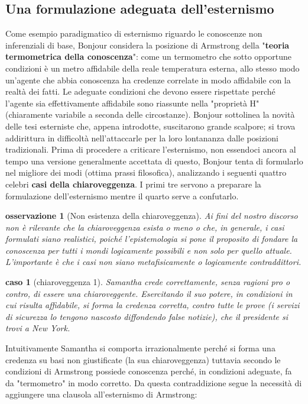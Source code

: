 \documentclass[10pt,a4paper]{article}
\newtheorem{caso}{caso}
\newtheorem{osservazione}{osservazione}
\begin{document}
\subsection{Una formulazione adeguata dell'esternismo}
Come esempio paradigmatico di esternismo riguardo le conoscenze non inferenziali di base, Bonjour considera la posizione di Armstrong della "\textbf{teoria termometrica della conoscenza}": come un termometro che sotto opportune condizioni è un metro affidabile della reale temperatura esterna, allo stesso modo un'agente che abbia conoscenza ha credenze correlate in modo affidabile con la realtà dei fatti. Le adeguate condizioni che devono essere rispettate perché l'agente sia effettivamente affidabile sono riassunte nella "proprietà H" (chiaramente variabile a seconda delle circostanze). Bonjour sottolinea la novità delle tesi esterniste che, appena introdotte, suscitarono grande scalpore; si trova addirittura in difficoltà nell'attaccarle per la loro lontananza dalle posizioni tradizionali. Prima di procedere a criticare l'esternismo, non essendoci ancora al tempo una versione generalmente accettata di questo, Bonjour tenta di formularlo nel migliore dei modi (ottima prassi filosofica), analizzando i seguenti quattro celebri \textbf{casi della chiaroveggenza}. I primi tre servono a preparare la formulazione dell'esternismo mentre il quarto serve a confutarlo. 
\begin{osservazione}[Non esistenza della chiaroveggenza]
Ai fini del nostro discorso non è rilevante che la chiaroveggenza esista o meno o che, in generale, i casi formulati siano realistici, poiché l'epistemologia si pone il proposito di fondare la conoscenza per tutti i mondi logicamente possibili e non solo per quello attuale. L'importante è che i casi non siano metafisicamente o logicamente contraddittori.
\end{osservazione}
\begin{caso}[chiaroveggenza 1]
	Samantha crede correttamente, senza ragioni pro o contro, di essere una chiaroveggente. Esercitando il suo potere, in condizioni in cui risulta affidabile, si forma la credenza corretta, contro tutte le prove (i servizi di sicurezza lo tengono nascosto diffondendo false notizie), che il presidente si trovi a New York.
\end{caso}
Intuitivamente Samantha si comporta irrazionalmente perché si forma una credenza su basi non giustificate (la sua chiaroveggenza) tuttavia secondo le condizioni di Armstrong possiede conoscenza perché, in condizioni adeguate, fa da "termometro" in modo corretto. Da questa contraddizione segue la necessità di aggiungere una clausola all'esternismo di Armstrong:\\\\
\end{document}
